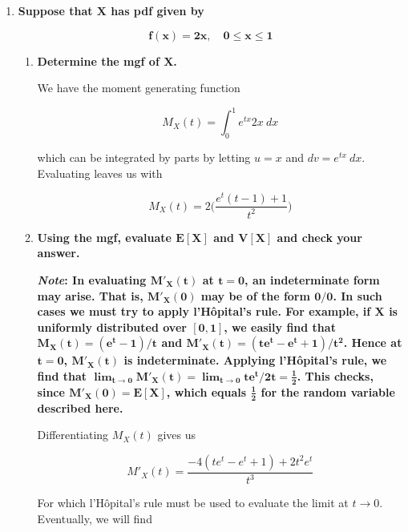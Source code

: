 \documentclass[10pt, oneside]{article}   	%
\theoremstyle{definition}
\begin{document}
\begin{enumerate}[label=10.\arabic*]
\itemsep0em 
\item  \begin{tcolorbox}[
  colback=Cerulean!5!white,
  colframe=Cerulean!75!black]
\textbf{Suppose that $\bm{X}$ has pdf given by}

\[ \bm{f(x) = 2x, \quad 0 \leq x \leq 1} \]
\end{tcolorbox}

	\begin{enumerate}
	\item  \begin{tcolorbox}[
	  colback=Cerulean!5!white,
	  colframe=Cerulean!75!black]
	\textbf{Determine the mgf of $\bm{X}$.}
	\end{tcolorbox}
	
	We have the moment generating function
	
	\[ M_X (t) = \int^1_0 e^{tx} 2x \ dx \]
	
	which can be integrated by parts by letting $u = x$ and $dv = e^{tx} \ dx$. Evaluating leaves us with
	
	\[ \boxed{M_X(t) = 2 \bigg( \frac{e^t (t-1) + 1}{t^2} \bigg) } \]
	
	\item  \begin{tcolorbox}[
	  colback=Cerulean!5!white,
	  colframe=Cerulean!75!black]
	\textbf{Using the mgf, evaluate $\bm{E[X]}$ and $\bm{V[X]}$ and check your answer.}
	
	\textbf{\textit{Note}: In evaluating $\bm{M'_X(t)}$ at $\bm{t=0}$, an indeterminate form may arise. That is, $\bm{M'_X(0)}$ may be of the form $\bm{0/0}$. In such cases we must try to apply l'H\^{o}pital's rule. For example, if $\bm{X}$ is uniformly distributed over $\bm{[0,1]}$, we easily find that $\bm{M_X(t) = (e^t - 1)/t}$ and $\bm{M'_X(t) = (te^t - e^t + 1)/t^2}$. Hence at $\bm{t=0}$, $\bm{M'_X(t)}$ is indeterminate. Applying l'H\^{o}pital's rule, we find that $\bm{\lim_{t \rightarrow 0} M'_X(t) = \lim_{t \rightarrow 0} te^t / 2t = \frac{1}{2}}$. This checks, since $\bm{M'_X(0) = E[X]}$, which equals $\bm{\frac{1}{2}}$ for the random variable described here.}
	\end{tcolorbox}
	
	Differentiating $M_X (t)$ gives us
	
	\[ M'_X(t) = \frac{-4(te^t - e^t + 1) + 2t^2 e^t}{t^3} \]
	
	For which  l'H\^{o}pital's rule must be used to evaluate the limit at $t \rightarrow 0$. Eventually, we will find
	

\end{enumerate}
\end{enumerate}
\end{document}
